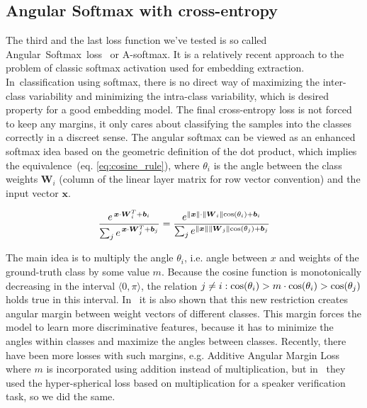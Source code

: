 \subsection*{Angular Softmax with cross-entropy}

The third and the last loss function we've tested is so called Angular~Softmax~loss~\cite{A_softmax_original} or A-softmax. It is a relatively recent approach to the problem of classic softmax activation used for embedding extraction. In~classification using softmax, there is no direct way of maximizing the inter-class variability and minimizing the intra-class variability, which is desired property for a good embedding model. The final cross-entropy loss is not forced to keep any margins, it only cares about classifying the samples into the classes correctly in a discreet sense. The angular softmax can be viewed as an enhanced softmax idea based on the geometric definition of the dot product, which implies the equivalence~(eq. \ref{eq:cosine_rule}), where $ \theta_i $ is the angle between the class weights $ \boldsymbol{W}_i $ (column of the linear layer matrix for row vector convention) and the input vector $ \boldsymbol{x} $.

\begin{equation} \label{eq:cosine_rule}
\frac{e^{\,\boldsymbol{x} \cdot \boldsymbol{W}_i^T + \boldsymbol{b}_i}}
{\sum_{j} e^{\,\boldsymbol{x} \cdot \boldsymbol{W}_j^T + \boldsymbol{b}_j}} =
\frac{e^{\lVert\boldsymbol{x}\rVert \cdot \lVert\boldsymbol{W}_i\rVert \textnormal{cos}(\theta_i)  + \boldsymbol{b}_i}}
{\sum_{j} e^{\lVert\boldsymbol{x}\rVert \lVert\boldsymbol{W}_j\rVert \textnormal{cos}(\theta_j)  + \boldsymbol{b}_j}}
\end{equation}

\medskip
\noindent
The main idea is to multiply the angle $ \theta_i $, i.e. angle between $ x $ and weights of the ground-truth class by some value $ m $. Because the cosine function is monotonically decreasing in the interval $ \langle 0, \pi \rangle $, the relation $ j \neq i : \textnormal{cos}(\theta_i) > m \cdot \textnormal{cos}(\theta_i) > \textnormal{cos}(\theta_j) $ holds true in this interval. In~\cite{A_softmax_original} it is also shown that this new restriction creates angular margin between weight vectors of different classes. This margin forces the model to learn more discriminative features, because it has to minimize the angles within classes and maximize the angles between classes. Recently, there have been more losses with such margins, e.g. Additive Angular Margin Loss \cite{arc_face} where $ m $ is incorporated using addition instead of multiplication, but in~\cite{A_softmax} they used the hyper-spherical loss based on multiplication for a speaker verification task, so we did the same.


